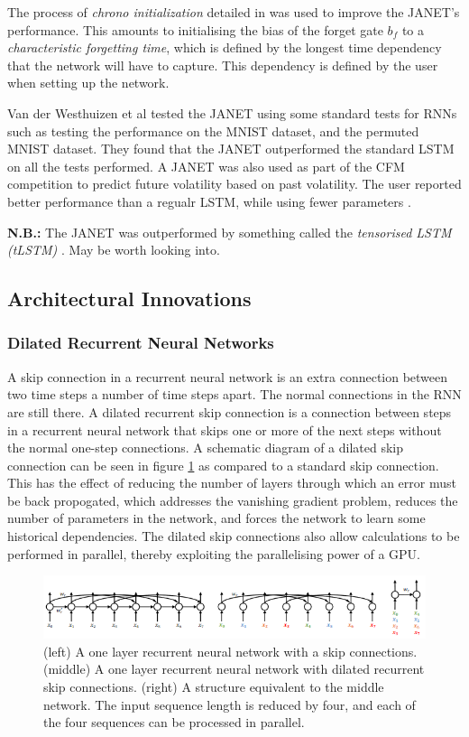 \documentclass[a4paper,12pt]{article}
\theoremstyle{definition}
\begin{document}
The process of \textit{chrono initialization} detailed in \cite{tallec} was used to improve the JANET's performance. This amounts to initialising the bias of the forget gate $b_f$ to a \textit{characteristic forgetting time}, which is defined by the longest time dependency that the network will have to capture. This dependency is defined by the user when setting up the network.

Van der Westhuizen et al tested the JANET using some standard tests for RNNs such as testing the performance on the MNIST dataset, and the permuted MNIST dataset. They found that the JANET outperformed the standard LSTM on all the tests performed. A JANET was also used as part of the CFM competition to predict future volatility based on past volatility. The user reported better performance than a regualr LSTM, while using fewer parameters \cite{cfm}.

\textbf{N.B.:} The JANET was outperformed by something called the \textit{tensorised LSTM (tLSTM)} \cite{he}. May be worth looking into.

\subsection{Architectural Innovations}

\subsubsection{Dilated Recurrent Neural Networks \cite{chang}}
A skip connection in a recurrent neural network is an extra connection between two time steps a number of time steps apart. The normal connections in the RNN are still there. A dilated recurrent skip connection is a connection between steps in a recurrent neural network that skips one or more of the next steps without the normal one-step connections. A schematic diagram of a dilated skip connection can be seen in figure \ref{fig:dilated_connection} as compared to a standard skip connection. This has the effect of reducing the number of layers through which an error must be back propogated, which addresses the vanishing gradient problem, reduces the number of parameters in the network, and forces the network to learn some historical dependencies. The dilated skip connections also allow calculations to be performed in parallel, thereby exploiting the parallelising power of a GPU. 

\begin{figure}[ht]
	\centering
	\includegraphics[width=\textwidth]{figures/dilated_skip_connection.png}
	\caption{(left) A one layer recurrent neural network with a skip connections. (middle) A one layer recurrent neural network with dilated recurrent skip connections. (right) A structure equivalent to the middle network. The input sequence length is reduced by four, and each of the four sequences can be processed in parallel.}
	\label{fig:dilated_connection}
\end{figure}
\end{document}
